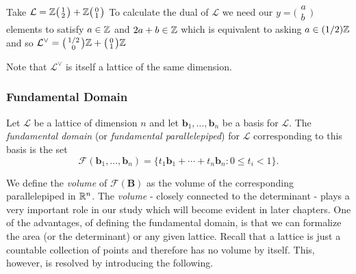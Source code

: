 \begin{example}
    Take $\mathcal{L}= \mathbb{Z} 
        \big(\begin{smallmatrix} 1\\2 \end{smallmatrix}\big) + 
        \mathbb{Z} \big(\begin{smallmatrix} 0\\ 1 \end{smallmatrix}\big)$
        To calculate the dual of $\mathcal{L}$ we need our $y = \big(\begin{smallmatrix}
          a\\b\end{smallmatrix}\big)$ elements to satisfy $a \in \mathbb{Z}$ and $2a + b \in \mathbb{Z}$ which is equivalent to asking $a \in (1/2)\mathbb{Z}$ and so $\mathcal{L}^{\vee} = \big(\begin{smallmatrix}
          1/2\\0
        \end{smallmatrix}\big)\mathbb{Z} + \big(\begin{smallmatrix}
          0\\1
        \end{smallmatrix}\big) \mathbb{Z}$
\end{example}

Note that $\mathcal{L}^{\vee}$ is itself a lattice of the same dimension.

\subsubsection*{Fundamental Domain}
\begin{definition} \label{fundamental}
    Let $\mathcal{L}$ be a lattice of dimension $n$ and let $\bm{b}_1, \dots, \bm{b}_n$ be a basis for $\mathcal{L}$. The \textit{fundamental domain} (or \textit{fundamental parallelepiped}) for $\mathcal{L}$ corresponding to this basis is the set
    $$ \mathcal{F}(\bm{b}_1, \dots, \bm{b}_n) = \{t_1\bm{b}_1 + \cdots + t_n\bm{b}_n : 0 \leq t_i < 1 \}.$$
\end{definition}

We define the \textit{volume} of $\mathcal{F}(\bm{B})$ as the volume of the corresponding parallelepiped in $\mathbb{R}^n$. The \textit{volume} - closely connected to the determinant - plays a very important role in our study which will become evident in later chapters. One of the advantages, of defining the fundamental domain, is that we can formalize the area (or the determinant) or any given lattice. Recall that a lattice is just a countable collection of points and therefore has no volume by itself. This, however, is resolved by introducing the following.

